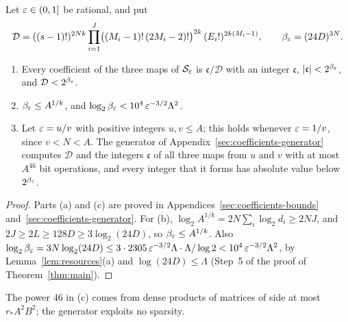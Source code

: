 \begin{proposition}\label{prop:coefficients}
Let \(\varepsilon\in(0,1]\) be rational, and put
\[
 \mathcal D=((s-1)!)^{2Nk}\prod_{i=1}^J
 \bigl((M_i-1)!\,(2M_i-2)!\bigr)^{2k}\,(E_i!)^{2k(M_i-1)},\qquad
 \beta_\varepsilon=(24D)^{3N}.
\]
\begin{enumerate}
\item[(a)] Every coefficient of the three maps of \(\mathcal S_\varepsilon\) is
 \(\mathfrak c/\mathcal D\) with an integer \(\mathfrak c\),
 \(|\mathfrak c|<2^{\beta_\varepsilon}\), and \(\mathcal D<2^{\beta_\varepsilon}\).
\item[(b)] \(\beta_\varepsilon\le A^{1/k}\), and
 \(\log_2\beta_\varepsilon<10^4\,\varepsilon^{-3/2}\Lambda^2\).
\item[(c)] Let \(\varepsilon=u/v\) with positive integers \(u,v\le A\); this
 holds whenever \(\varepsilon=1/v\), since \(v<N<A\). The generator of
 Appendix~\ref{sec:coefficients-generator} computes \(\mathcal D\) and
 the integers \(\mathfrak c\) of all three maps from \(u\) and \(v\) with
 at most \(A^{46}\) bit operations, and every integer that it forms has
 absolute value below \(2^{\beta_\varepsilon}\).
\end{enumerate}
\end{proposition}

\begin{proof}
Parts (a) and (c) are proved in
Appendices~\ref{sec:coefficients-bounds}
and~\ref{sec:coefficients-generator}. For (b), \(\log_2A^{1/k}
=2N\sum_i\log_2d_i\ge2NJ\), and \(2J\ge2L\ge128D\ge3\log_2(24D)\), so
\(\beta_\varepsilon\le A^{1/k}\). Also \(\log_2\beta_\varepsilon=3N\log_2(24D)
\le3\cdot2305\,\varepsilon^{-3/2}\Lambda\cdot\Lambda/\log2<10^4\,\varepsilon^{-3/2}\Lambda^2\),
by Lemma~\ref{lem:resources}(a) and \(\log(24D)\le\Lambda\) (Step~5 of
the proof of Theorem~\ref{thm:main}).
\end{proof}

The power \(46\) in (c) comes from dense products of matrices of side
at most \(r_*A^2B^2\); the generator exploits no sparsity.

